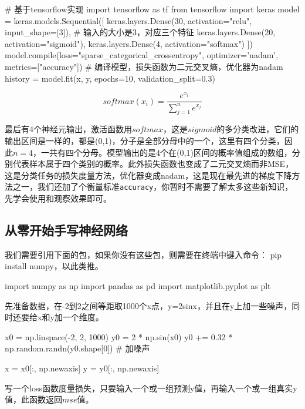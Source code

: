 \documentclass[a5paper, 11pt]{ctexbook}
\begin{document}
\newpage

\begin{python}
    # 基于tensorflow实现
    import tensorflow as tf
    from tensorflow import keras
    model = keras.models.Sequential([
            keras.layers.Dense(30, activation="relu", input_shape=[3]),
            # 输入的大小是3，对应三个特征
            keras.layers.Dense(20, activation="sigmoid"),
            keras.layers.Dense(4, activation="softmax")
        ])
    model.compile(loss="sparse_categorical_crossentropy", optimizer='nadam', metrics=["accuracy"])
    # 编译模型，损失函数为二元交叉熵，优化器为nadam
    history = model.fit(x, y, epochs=10,
    validation_split=0.3)
\end{python}

\begin{equation}
    softmax(x_i) = \frac{e^{x_i}}{\sum^{n}_{j=1}{e^{x_j}}}
\end{equation}

最后有4个神经元输出，激活函数用$softmax$，这是$sigmoid$的多分类改进，它们的输出区间是一样的，都是(0,1)，分子是全部分母中的一个，这里有四个分类，因此$n=4$，一共有四个分母。模型输出的是4个在(0,1)区间的概率值组成的数组，分别代表样本属于四个类别的概率。此外损失函数也变成了二元交叉熵而非MSE，这是分类任务的损失度量方法，优化器变成nadam，这是现在最先进的梯度下降方法之一，我们还加了个衡量标准\verb|accuracy|，你暂时不需要了解太多这些新知识，先学会使用和观察效果即可。

\subsection{从零开始手写神经网络}

我们需要引用下面的包，如果你没有这些包，则需要在终端中键入命令：
pip install numpy，以此类推。
\begin{python}
    import numpy as np
    import pandas as pd
    import matplotlib.pyplot as plt
\end{python}

先准备数据，在-2到2之间等距取1000个x点，y=2sinx，并且在y上加一些噪声，同时还要给x和y加一个维度。
\begin{python}
    x0 = np.linspace(-2, 2, 1000)
    y0 = 2 * np.sin(x0)
    y0 += 0.32 * np.random.randn(y0.shape[0]) # 加噪声

    x = x0[:, np.newaxis]
    y = y0[:, np.newaxis]
\end{python}

写一个loss函数度量损失，只要输入一个或一组预测y值，再输入一个或一组真实y值，此函数返回$mse$值。
\end{document}
